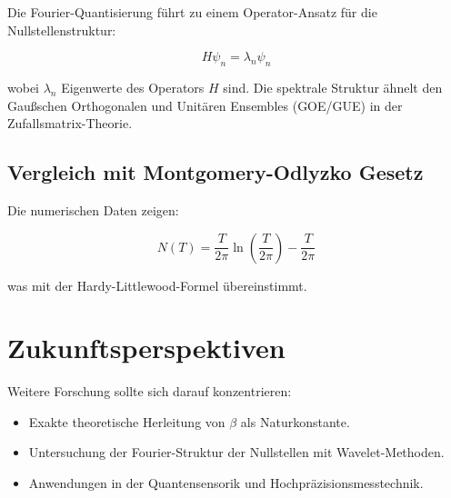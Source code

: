 \documentclass[a4paper,12pt]{article}
\begin{document}
Die Fourier-Quantisierung führt zu einem Operator-Ansatz für die Nullstellenstruktur:

\begin{equation}
    H \psi_n = \lambda_n \psi_n
\end{equation}

wobei $\lambda_n$ Eigenwerte des Operators $H$ sind. Die spektrale Struktur ähnelt den Gaußschen Orthogonalen und Unitären Ensembles (GOE/GUE) in der Zufallsmatrix-Theorie.

\subsection{Vergleich mit Montgomery-Odlyzko Gesetz}
Die numerischen Daten zeigen:

\begin{equation}
    N(T) = \frac{T}{2\pi} \ln\left(\frac{T}{2\pi}\right) - \frac{T}{2\pi}
\end{equation}

was mit der Hardy-Littlewood-Formel übereinstimmt.

\section{Zukunftsperspektiven}

Weitere Forschung sollte sich darauf konzentrieren:
\begin{itemize}
    \item Exakte theoretische Herleitung von $\beta$ als Naturkonstante.
    \item Untersuchung der Fourier-Struktur der Nullstellen mit Wavelet-Methoden.
    \item Anwendungen in der Quantensensorik und Hochpräzisionsmesstechnik.
\end{itemize}
\end{document}
